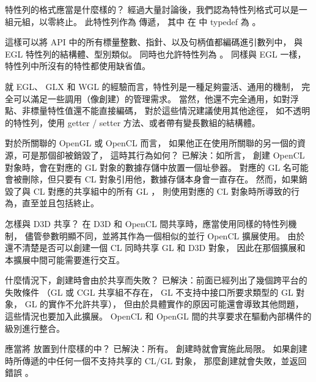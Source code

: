 \startQUESTION
特性列的格式應當是什麼樣的？
\stopQUESTION
\startANSWER
經過大量討論後，我們認為特性列格式可以是一組{}元組，以零終止。
此特性列作為  傳遞，
其中  在  中 typedef 為 。

這樣可以將 API 中的所有標量整數、指針、以及句柄值都編碼進引數列中，
與 EGL 特性列的結構體、型別類似。
同時也允許特性列為 。
同樣與 EGL 一樣，特性列中所沒有的特性都使用缺省值。

就 EGL、 GLX 和 WGL 的經驗而言，特性列是一種足夠靈活、通用的機制，
完全可以滿足一些調用（像創建）的管理需求。
當然，他還不完全通用，如對浮點、非標量特性值還不能直接編碼，
對於這些情況建議使用其他途徑，
如不透明的特性列，使用 getter / setter 方法、或者帶有變長數組的結構體。
\stopANSWER

\startQUESTION
對於所關聯的 OpenGL 或 OpenCL 而言，
如果他正在使用所關聯的另一個的資源，可是那個卻被銷毀了，
這時其行為如何？
\stopQUESTION
\startANSWER
已解決：如所言，
創建 OpenCL 對象時，會在對應的 GL 對象的數據存儲中放置一個址參器。
對應的 GL 名可能會被刪除，但只要有 CL 對象引用他，數據存儲本身會一直存在。
然而，如果銷毀了與 CL 對應的共享組中的所有 GL ，
則使用對應的 CL 對象時所導致的行為，直至並且包括終止。
\stopANSWER

\startQUESTION
怎樣與 D3D 共享？
\stopQUESTION
\startANSWER
在 D3D 和 OpenCL 間共享時，應當使用同樣的特性列機制，
儘管參數明顯不同，並將其作為一個相似的並行 OpenCL 擴展使用。
由於還不清楚是否可以創建一個 CL 同時共享 GL 和 D3D 對象，
因此在那個擴展和本擴展中間可能需要進行交互。
\stopANSWER

\startQUESTION
什麼情況下，創建時會由於共享而失敗？
\stopQUESTION
\startANSWER
已解決：前面已經列出了幾個跨平台的失敗條件
（GL 或 CGL 共享組不存在，
 GL 不支持中接口所要求類型的 GL 對象，
 GL 的實作不允許共享），
但由於具體實作的原因可能還會導致其他問題，
這些情況也要加入此擴展。
 OpenCL 和 OpenGL 間的共享要求在驅動內部構件的級別進行整合。
\stopANSWER

\startQUESTION
應當將  放置到什麼樣的中？
\stopQUESTION
\startANSWER
已解決：所有。
創建時就會實施此局限。
如果創建時所傳遞的中任何一個不支持共享的 CL/GL 對象，
那麼創建就會失敗，並返回錯誤 。
\stopANSWER

